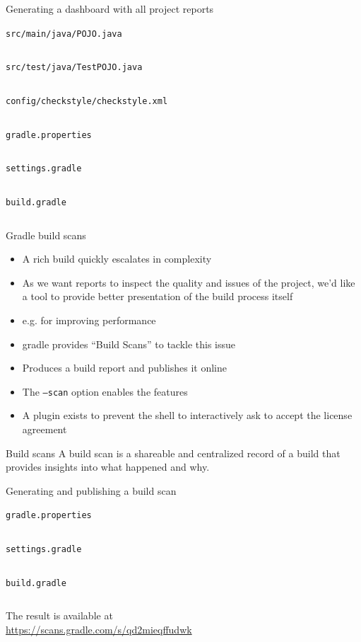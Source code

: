 \documentclass[presentation]{beamer}
\newcommand{\codefile}[4]{
	\begin{block}{\texttt{#2}}
		\inputminted[fontsize=#3,linenos=true,breaklines=true]{#4}{"workspace/#1/#2"}
	\end{block}
}
\newcommand{\java}[3]{\codefile{#1}{#2}{#3}{java}}
\newcommand{\groovy}[3]{\codefile{#1}{#2}{#3}{groovy}}
\newcommand{\tinier}{\fontsize{4pt}{5pt}\selectfont}
\begin{document}
\begin{frame}{Generating a dashboard with all project reports}
    \java{21-Dashboard}{src/main/java/POJO.java}{\tinier}
    \java{21-Dashboard}{src/test/java/TestPOJO.java}{\tinier}
    \begin{block}{\texttt{config/checkstyle/checkstyle.xml}}
        \inputminted[fontsize=\tiny,linenos=true,breaklines=true,firstline=1,lastline=25]{xml}{workspace/21-Dashboard/config/checkstyle/checkstyle.xml}
    \end{block}
    \groovy{21-Dashboard}{gradle.properties}{\scriptsize}
    \groovy{21-Dashboard}{settings.gradle}{\normalsize}
    \groovy{21-Dashboard}{build.gradle}{\scriptsize}
\end{frame}

\begin{frame}[fragile]{Gradle build scans}
    \begin{itemize}
        \item A rich build quickly escalates in complexity
        \item As we want reports to inspect the quality and issues of the project, we'd like a tool to provide better presentation of the build process itself
        \item e.g. for improving performance
        \item gradle provides ``Build Scans'' to tackle this issue
        \item Produces a build report and publishes it online
        \item The \texttt{--scan} option enables the features
        \item A plugin exists to prevent the shell to interactively ask to accept the license agreement
    \end{itemize}
    \begin{block}{Build scans}
        A build scan is a shareable and centralized record of a build that provides insights into what happened and why.
    \end{block}
\end{frame}

\begin{frame}{Generating and publishing a build scan}
    \groovy{22-Scans}{gradle.properties}{\scriptsize}
    \groovy{22-Scans}{settings.gradle}{\normalsize}
    \groovy{22-Scans}{build.gradle}{\tiny}
    \begin{block}{}
        The result is available at\\ \url{https://scans.gradle.com/s/qd2mieqffudwk}
    \end{block}
\end{frame}
\end{document}
